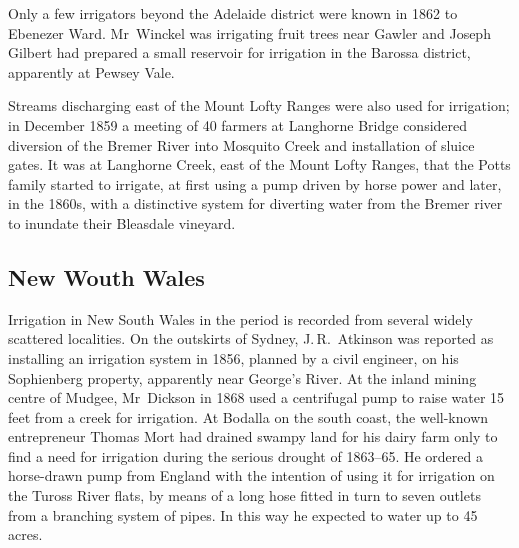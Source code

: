 Only a few irrigators beyond the Adelaide district were known in 1862
to Ebenezer Ward.   Mr~Winckel was irrigating fruit
trees near Gawler and Joseph Gilbert  had prepared
a small reservoir for irrigation in the Barossa 
district, apparently at Pewsey
Vale.

Streams discharging east of the Mount Lofty Ranges were also used for
irrigation; in December 1859 a meeting of 40 farmers at Langhorne
Bridge considered diversion of the Bremer River 
into Mosquito Creek  and installation of sluice
gates.  It was at Langhorne Creek,
 east of the
Mount Lofty Ranges, that the Potts family started to irrigate, at
first using a pump driven by horse power and later, in the 1860s, with
a distinctive system for diverting water from the Bremer river to
inundate their Bleasdale  vineyard.

\subsection*{New Wouth Wales}

Irrigation in New South Wales in the period is recorded from several
widely scattered localities.  On the outskirts of
Sydney, J.\,R.~Atkinson  was
reported as installing an irrigation system in 1856, planned by a
civil engineer, on his Sophienberg property, apparently near George's
River.   At the inland mining centre of Mudgee,
 Mr~Dickson in 1868 used a centrifugal pump
 to raise
water 15\,feet from a creek for irrigation.  At Bodalla 
on the south coast, the well-known entrepreneur Thomas Mort
 had
drained swampy land for his dairy farm only to find a need for
irrigation during the serious drought of 1863--65.  He ordered a
horse-drawn pump  from England with the
intention of using it for irrigation on the Tuross River
 flats, by
means of a long hose fitted in turn to seven outlets from a branching
system of pipes.  In this way he expected to water up to 45\,acres.

